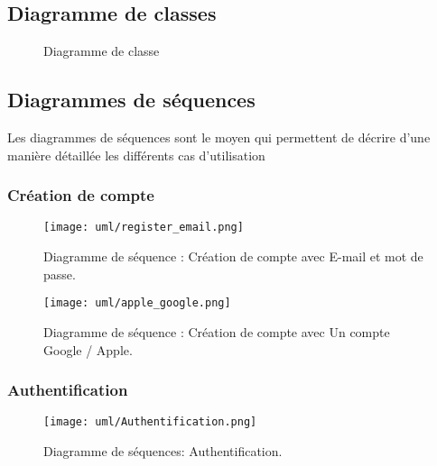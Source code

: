 \subsection{Diagramme de classes}
\begin{figure}[H]
    \centering
    \vspace{1cm}
    \captionsetup{justification=centering}

    \caption{Diagramme de classe}
    \label{fig:class_diag}
\end{figure}
\clearpage
\subsection{Diagrammes de séquences}
Les diagrammes de séquences sont le moyen qui permettent de décrire d'une manière détaillée les différents cas d'utilisation
\subsubsection{Création de compte}
\begin{figure}[H]
    \centering
    \texttt{[image: uml/register\_email.png]}
    \vspace{1cm}
    \captionsetup{justification=centering}

    \caption{Diagramme de séquence : Création de compte avec E-mail et mot de passe.}
    \label{fig:seq_register_email}
\end{figure}
\begin{figure}[H]
    \centering
    \texttt{[image: uml/apple\_google.png]}
    \vspace{1cm}
    \captionsetup{justification=centering}

    \caption{Diagramme de séquence : Création de compte avec Un compte Google / Apple.}
    \label{fig:seq_register_apple_google}
\end{figure}
\subsubsection{Authentification}
\begin{center}
    \begin{figure}[H]
        \centering
        \texttt{[image: uml/Authentification.png]}
        \vspace{1cm}
        \captionsetup{justification=centering}

        \caption{Diagramme de séquences: Authentification.}
        \label{fig:seq_auth}
    \end{figure}
\end{center}
